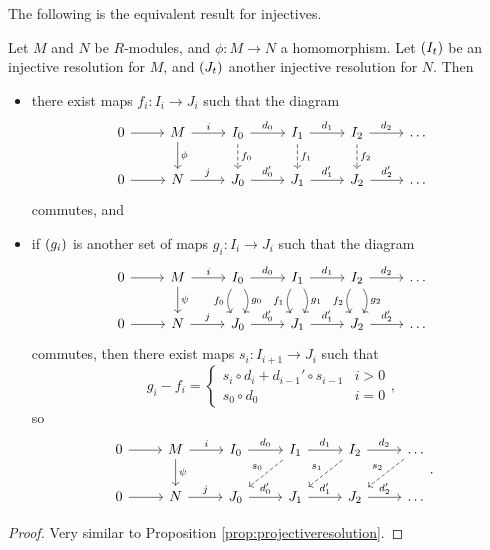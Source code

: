 The following is the equivalent result for injectives.

\begin{proposition}
Let $ M $ and $ N $ be $ R $-modules, and $ \phi : M \to N $ a homomorphism. Let $ \br{I_t} $ be an injective resolution for $ M $, and $ \br{J_t} $ another injective resolution for $ N $. Then
\begin{itemize}
\item there exist maps $ f_i : I_i \to J_i $ such that the diagram
$$
\begin{tikzcd}
0 \arrow{r} & M \arrow{r}{i} \arrow{d}{\phi} & I_0 \arrow{r}{d_0} \arrow[dashed]{d}{f_0} & I_1 \arrow{r}{d_1} \arrow[dashed]{d}{f_1} & I_2 \arrow{r}{d_2} \arrow[dashed]{d}{f_2} & \dots \\
0 \arrow{r} & N \arrow{r}{j} & J_0 \arrow{r}{d_0'} & J_1 \arrow{r}{d_1'} & J_2 \arrow{r}{d_2'} & \dots
\end{tikzcd}
$$
commutes, and
\item if $ \br{g_i} $ is another set of maps $ g_i : I_i \to J_i $ such that the diagram
$$
\begin{tikzcd}
0 \arrow{r} & M \arrow{r}{i} \arrow{d}{\psi} & I_0 \arrow{r}{d_0} \arrow[bend right=30, swap]{d}{f_0} \arrow[bend left=30]{d}{g_0} & I_1 \arrow{r}{d_1} \arrow[bend right=30, swap]{d}{f_1} \arrow[bend left=30]{d}{g_1} & I_2 \arrow{r}{d_2} \arrow[bend right=30, swap]{d}{f_2} \arrow[bend left=30]{d}{g_2} & \dots \\
0 \arrow{r} & N \arrow{r}{j} & J_0 \arrow{r}{d_0'} & J_1 \arrow{r}{d_1'} & J_2 \arrow{r}{d_2'} & \dots
\end{tikzcd}
$$
commutes, then there exist maps $ s_i : I_{i + 1} \to J_i $ such that
$$ g_i - f_i =
\begin{cases}
s_i \circ d_i + d_{i - 1}' \circ s_{i - 1} & i > 0 \\
s_0 \circ d_0 & i = 0
\end{cases},
$$
so
$$
\begin{tikzcd}
0 \arrow{r} & M \arrow{r}{i} \arrow{d}{\psi} & I_0 \arrow{r}{d_0} & I_1 \arrow{r}{d_1} \arrow[dashed, swap]{dl}{s_0} & I_2 \arrow{r}{d_2} \arrow[dashed, swap]{dl}{s_1} & \dots \arrow[dashed, swap]{dl}{s_2} \\
0 \arrow{r} & N \arrow{r}{j} & J_0 \arrow{r}{d_0'} & J_1 \arrow{r}{d_1'} & J_2 \arrow{r}{d_2'} & \dots
\end{tikzcd}.
$$
\end{itemize}
\end{proposition}

\begin{proof}
Very similar to Proposition \ref{prop:projectiveresolution}.
\end{proof}


